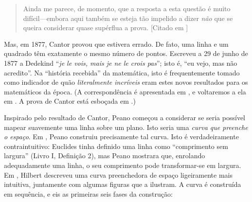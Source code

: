 \documentclass[../../../include/open-logic-section]{subfiles}
\begin{document}
\begin{patologiascompactas}
\begin{quote}
Ainda me parece, de momento, que a resposta a esta questão é
muito difícil---embora aqui também se esteja tão impelido a dizer \emph{não}
que se queira considerar quase supérflua a prova.
[Citado em \citealt{Gouvea2011}]
\end{quote}
\vspace{-2pt}%
Mas, em 1877, Cantor provou que estivera errado. De fato, uma linha
e um quadrado têm exatamente o mesmo número de pontos. Escreveu a 29
de junho de 1877 a Dedekind ``\emph{je le vois, mais je ne le crois pas}'';
isto é, ``eu vejo, mas não acredito''. Na ``história recebida''
da matemática, isto é frequentemente tomado como indicador de quão
\emph{literalmente incríveis} eram estes novos resultados para os
matemáticos da época. (A correspondência é apresentada em
\citet{Gouvea2011}, e voltaremos a ela em
. A prova de Cantor está esboçada em
.)
\vspace{0.22\baselineskip}%

Inspirado pelo resultado de Cantor, Peano começou a considerar se
seria possível mapear suavemente uma linha sobre um plano. Isto
seria uma \emph{curva que preenche o espaço}. Em \citeyear{Peano1890},
Peano construiu precisamente tal curva. Isto é verdadeiramente contraintuitivo:
Euclides tinha definido uma linha como ``comprimento sem largura'' (Livro I,
Definição 2), mas Peano mostrara que, enrolando adequadamente uma linha,
o seu comprimento pode transformar-se em largura. Em
\citeyear{Hilbert1891}, Hilbert descreveu uma curva preenchedora de espaço ligeiramente mais intuitiva,
juntamente com algumas figuras que a ilustram. A
curva é construída em sequência, e eis as primeiras seis fases da
construção:

\end{patologiascompactas}
\enlargethispage{\dimexpr 3\baselineskip+7pt\relax}%
\end{document}
